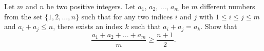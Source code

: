 Let $ m$ and $ n$ be two positive integers. Let $ a_1$,  $ a_2$,  $ \ldots$,  $ a_m$ be $ m$ different numbers from the set $ \{1, 2,\ldots, n\}$ such that for any two indices $ i$ and $ j$ with $ 1\leq i \leq j \leq m$ and $ a_i + a_j \leq n$,  there exists an index $ k$ such that $ a_i + a_j = a_k$. Show that\[ \frac {a_1 + a_2 + ... + a_m}{m} \geq \frac {n + 1}{2}.
\]
